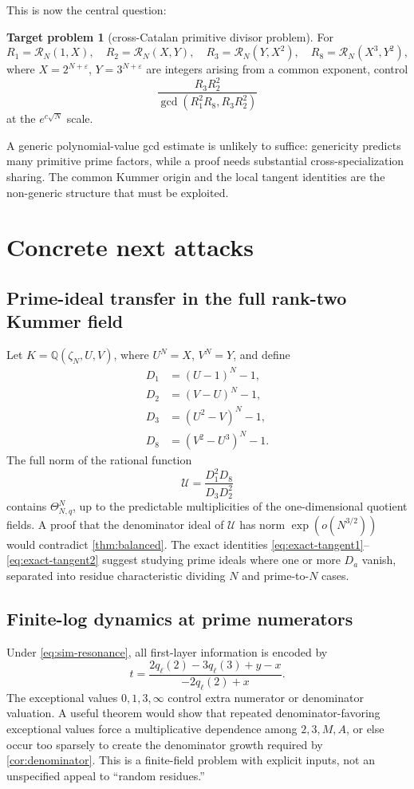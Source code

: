 \documentclass[11pt]{article}
\theoremstyle{definition}
\newtheorem{problem}[theorem]{Target problem}
\theoremstyle{remark}
\newcommand{\QQ}{\mathbb Q}
\newcommand{\eps}{\varepsilon}
\begin{document}
This is now the central question:

\begin{problem}[cross-Catalan primitive divisor problem]\label{prob:cross}
For
\[
R_1=\mathscr R_N(1,X),\quad
R_2=\mathscr R_N(X,Y),\quad
R_3=\mathscr R_N(Y,X^2),\quad
R_8=\mathscr R_N(X^3,Y^2),
\]
where \(X=2^{N+\eps}\), \(Y=3^{N+\eps}\) are integers arising from a common exponent, control
\[
\frac{R_3R_2^2}{\gcd(R_1^2R_8,R_3R_2^2)}
\]
at the \(e^{c\sqrt N}\) scale.
\end{problem}

A generic polynomial-value gcd estimate is unlikely to suffice: genericity predicts many primitive prime factors, while a proof needs substantial cross-specialization sharing.  The common Kummer origin and the local tangent identities are the non-generic structure that must be exploited.

\section{Concrete next attacks}\label{sec:next}

\subsection{Prime-ideal transfer in the full rank-two Kummer field}
Let \(K=\QQ(\zeta_N,U,V)\), where \(U^N=X\), \(V^N=Y\), and define
\begin{align*}
D_1&=(U-1)^N-1,\\
D_2&=(V-U)^N-1,\\
D_3&=(U^2-V)^N-1,\\
D_8&=(V^2-U^3)^N-1.
\end{align*}
The full norm of the rational function
\begin{equation}\label{eq:alpha-full}
\mathcal U=\frac{D_1^2D_8}{D_3D_2^2}
\end{equation}
contains \(\Theta_{N,q}^N\), up to the predictable multiplicities of the one-dimensional quotient fields.  A proof that the denominator ideal of \(\mathcal U\) has norm
\(\exp(o(N^{3/2}))\) would contradict \cref{thm:balanced}.  The exact identities \eqref{eq:exact-tangent1}--\eqref{eq:exact-tangent2} suggest studying prime ideals where one or more \(D_a\) vanish, separated into residue characteristic dividing \(N\) and prime-to-\(N\) cases.

\subsection{Finite-log dynamics at prime numerators}
Under \eqref{eq:sim-resonance}, all first-layer information is encoded by
\[
t=\frac{2q_\ell(2)-3q_\ell(3)+y-x}{-2q_\ell(2)+x}.
\]
The exceptional values \(0,1,3,\infty\) control extra numerator or denominator valuation.  A useful theorem would show that repeated denominator-favoring exceptional values force a multiplicative dependence among \(2,3,M,A\), or else occur too sparsely to create the denominator growth required by \cref{cor:denominator}.  This is a finite-field problem with explicit inputs, not an unspecified appeal to ``random residues.''
\end{document}
